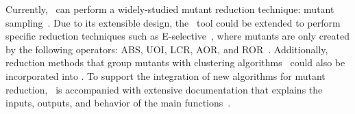 






Currently, \mr~can perform a widely-studied mutant reduction technique: mutant sampling~\cite{gopinath2015mutation,
jia2011analysis, gopinath2015empirical}. Due to its extensible design, the \mr~tool could be extended to perform
specific reduction techniques such as E-selective~\cite{offutt1996experimental}, where mutants are only created by the
following operators: ABS, UOI, LCR, AOR, and ROR~\cite{gopinath2015empirical}. Additionally, reduction methods that group
mutants with clustering algorithms~\cite{jia2011analysis} could also be incorporated into \mr. To support the
integration of new algorithms for mutant reduction, \mr~is accompanied with extensive documentation that explains the
inputs, outputs, and behavior of the main functions~\cite{tool}.



